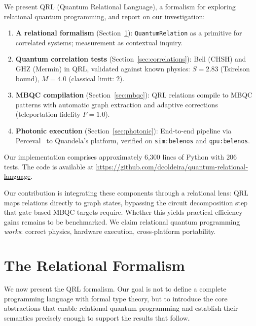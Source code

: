 \documentclass[submission,copyright,creativecommons]{eptcs}
\newcommand{\qrl}{\textsc{QRL}}
\newcommand{\mbqc}{\textsc{MBQC}}
\begin{document}
We present \qrl{} (Quantum Relational Language), a formalism for exploring
relational quantum programming, and report on our investigation:

\begin{enumerate}
    \item \textbf{A relational formalism} (Section~\ref{sec:formalism}):
    \texttt{QuantumRelation} as a primitive for correlated systems;
    measurement as contextual inquiry.

    \item \textbf{Quantum correlation tests} (Section~\ref{sec:correlations}):
    Bell (CHSH) and GHZ (Mermin) in \qrl{}, validated against known physics:
    $S = 2.83$ (Tsirelson bound), $M = 4.0$ (classical limit: 2).

    \item \textbf{MBQC compilation} (Section~\ref{sec:mbqc}):
    \qrl{} relations compile to \mbqc{} patterns with automatic graph
    extraction and adaptive corrections (teleportation fidelity $F=1.0$).

    \item \textbf{Photonic execution} (Section~\ref{sec:photonic}):
    End-to-end pipeline via Perceval~\cite{perceval} to Quandela's platform,
    verified on \texttt{sim:belenos} and \texttt{qpu:belenos}.
\end{enumerate}

Our implementation comprises approximately 6,300 lines of Python with 206
tests. The code is available at \url{https://github.com/dcoldeira/quantum-relational-language}.

Our contribution is integrating these components through a relational
lens: \qrl{} maps relations directly to graph states, bypassing the
circuit decomposition step that gate-based \mbqc{} targets require.
Whether this yields practical efficiency gains remains to be benchmarked.
We claim relational quantum programming \emph{works}: correct physics,
hardware execution, cross-platform portability.


\section{The Relational Formalism}
\label{sec:formalism}

We now present the \qrl{} formalism. Our goal is not to define a complete
programming language with formal type theory, but to introduce the core
abstractions that enable relational quantum programming and establish
their semantics precisely enough to support the results that follow.
\end{document}
